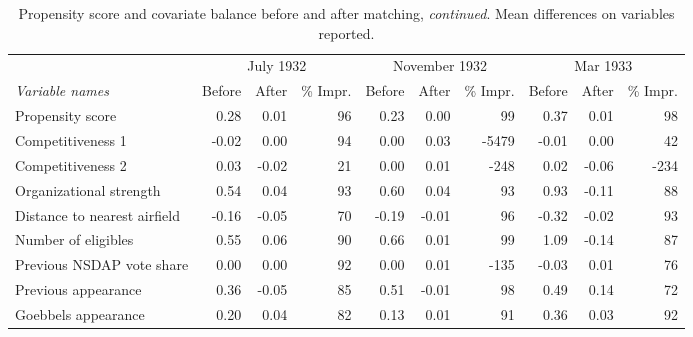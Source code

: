\begin{table}[t!]
\centering
\caption{Propensity score and covariate balance before and after matching, \textit{continued}. Mean differences on variables reported.\label{tab:balance2}} 
\begingroup\scriptsize
\begin{tabular}{lrrrrrrrrr}
  \toprule
   & \multicolumn{3}{c}{July 1932} &  \multicolumn{3}{c}{November 1932} & \multicolumn{3}{c}{Mar 1933}\\\cmidrule(r){2-4} \cmidrule(r){5-7} \cmidrule(r){8-10}\textit{Variable names} & Before & After & \% Impr. & Before & After & \% Impr. & Before & After & \% Impr.\\ \midrule
Propensity score & 0.28 & 0.01 & 96 & 0.23 & 0.00 & 99 & 0.37 & 0.01 & 98 \\ 
  Competitiveness 1 & -0.02 & 0.00 & 94 & 0.00 & 0.03 & -5479 & -0.01 & 0.00 & 42 \\ 
  Competitiveness 2 & 0.03 & -0.02 & 21 & 0.00 & 0.01 & -248 & 0.02 & -0.06 & -234 \\ 
  Organizational strength & 0.54 & 0.04 & 93 & 0.60 & 0.04 & 93 & 0.93 & -0.11 & 88 \\ 
  Distance to nearest airfield & -0.16 & -0.05 & 70 & -0.19 & -0.01 & 96 & -0.32 & -0.02 & 93 \\ 
  Number of eligibles & 0.55 & 0.06 & 90 & 0.66 & 0.01 & 99 & 1.09 & -0.14 & 87 \\ 
  Previous NSDAP vote share & 0.00 & 0.00 & 92 & 0.00 & 0.01 & -135 & -0.03 & 0.01 & 76 \\ 
  Previous appearance & 0.36 & -0.05 & 85 & 0.51 & -0.01 & 98 & 0.49 & 0.14 & 72 \\ 
  Goebbels appearance & 0.20 & 0.04 & 82 & 0.13 & 0.01 & 91 & 0.36 & 0.03 & 92 \\ 
   \bottomrule
\end{tabular}
\endgroup
\end{table}
